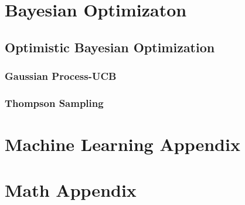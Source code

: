 \documentclass[
  fourColumns,
  landscape,
]{formularyETH/formularyETH}
\begin{document}
   \section{Bayesian Optimizaton}\label{sec:bayesian_optimizaton}
    
    
    \subsection{Optimistic Bayesian Optimization}\label{subsec:optimistic_bayesian_optimization}
    
      \subsubsection{Gaussian Process-UCB}\label{subsubsec:gaussian_process-ucb}
        
      \subsubsection{Thompson Sampling}\label{subsubsec:thompson_sampling}
        









% 
\section*{Machine Learning Appendix}\label{sec:ml_appendix}
  
\newpage
\section*{Math Appendix}\label{sec:math_appendix}

\end{document}
